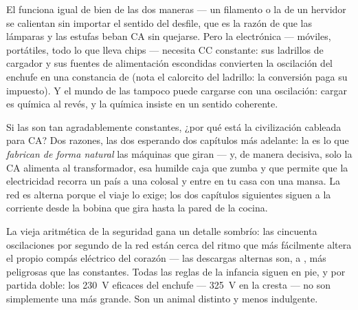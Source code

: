 \begin{example}\label{ex:g9:alternating-current:whocares}
El  funciona igual de bien de las dos maneras ---
un filamento o la  de un hervidor se calientan sin importar
el sentido del desfile, que es la razón de que las lámparas y las
estufas beban CA sin quejarse. Pero la electrónica --- móviles,
portátiles, todo lo que lleva chips --- necesita CC constante: sus
ladrillos de cargador y sus fuentes de alimentación escondidas
convierten la oscilación del enchufe en una constancia de  (nota el
calorcito del ladrillo: la conversión paga su impuesto). Y el mundo de
las  tampoco puede cargarse con una oscilación: cargar es
química al revés, y la química insiste en un sentido coherente.
\end{example}

\begin{remark}\label{rem:g9:alternating-current:why}
Si las  son tan agradablemente constantes, ¿por qué está la
civilización cableada para CA? Dos razones, las dos esperando dos
capítulos más adelante: la  es lo que
\emph{fabrican de forma natural} las máquinas que giran --- y, de manera
decisiva, solo la CA alimenta al transformador, esa humilde caja que
zumba y que permite que la electricidad recorra un país a una
 colosal y entre en tu casa con una mansa. La red es
alterna porque el viaje lo exige; los dos capítulos siguientes siguen a
la corriente desde la bobina que gira hasta la pared de la cocina.
\end{remark}

\begin{remark}\label{rem:g9:alternating-current:safety}
La vieja aritmética de la seguridad gana un detalle sombrío: las
cincuenta oscilaciones por segundo de la red están cerca del ritmo que
más fácilmente altera el propio compás eléctrico del corazón --- las
descargas alternas son,  a , más
peligrosas que las constantes. Todas las reglas de la infancia siguen
en pie, y por partida doble: los \qty{230}{V} eficaces del enchufe ---
\qty{325}{V} en la cresta --- no son simplemente una  más
grande. Son un animal distinto y menos indulgente.
\end{remark}


